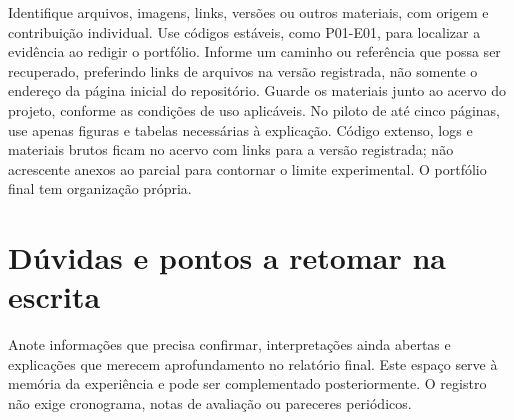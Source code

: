 Identifique arquivos, imagens, links, versões ou outros materiais, com origem
e contribuição individual. Use códigos estáveis, como P01-E01, para localizar
a evidência ao redigir o portfólio. Informe um caminho ou referência que possa
ser recuperado, preferindo links de arquivos na versão registrada, não somente
o endereço da página inicial do repositório. Guarde os materiais junto ao
acervo do projeto, conforme as condições de uso aplicáveis.
No piloto de até cinco páginas, use apenas figuras e tabelas necessárias à
explicação. Código extenso, logs e materiais brutos ficam no acervo com links
para a versão registrada; não acrescente anexos ao parcial para contornar
o limite experimental. O portfólio final tem organização própria.

\section*{Dúvidas e pontos a retomar na escrita}
Anote informações que precisa confirmar, interpretações ainda abertas e
explicações que merecem aprofundamento no relatório final. Este espaço serve
à memória da experiência e pode ser complementado posteriormente. O registro
não exige cronograma, notas de avaliação ou pareceres periódicos.
